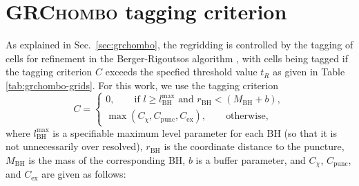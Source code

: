 \documentclass[floats,floatfix,showpacs,amssymb,prd,twocolumn,superscriptaddress,nofootinbib,nolongbibliography,reprint]{revtex4-2}
\begin{document}
\section{\textsc{GRChombo} tagging criterion}
\label{sec:tagging}
%
%
As explained in Sec.~\ref{sec:grchombo}, the regridding is controlled by 
the tagging of cells for refinement in the Berger-Rigoutsos algorithm 
\cite{Berger1991}, with cells being tagged if the tagging criterion $C$ 
exceeds the specfied threshold value $t_R$ as given in Table 
\ref{tab:grchombo-grids}. For this work, we use the 
tagging criterion
\begin{equation}
    C=
    \begin{cases}
        0,\qquad \text{if }l\geq l_{\mathrm{BH}}^{\max}
        \text{ and } r_{\mathrm{BH}} < (M_{\mathrm{BH}}+b),\\
        \max(C_{\chi},C_{\mathrm{punc}},C_{\mathrm{ex}}),
        \qquad\text{otherwise},
    \end{cases}
\end{equation}
where $l_{\mathrm{BH}}^{\max}$ is a specifiable maximum level parameter 
for each BH (so that it is not unnecessarily over resolved), 
$r_{\mathrm{BH}}$ is the coordinate distance to the puncture, 
$M_{\mathrm{BH}}$ is the mass of the corresponding BH, $b$ is a buffer 
parameter, and $C_\chi$, $C_{\mathrm{punc}}$, and $C_{\mathrm{ex}}$ are 
given as follows:
\end{document}
